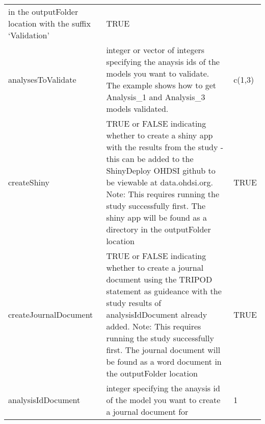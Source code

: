 \documentclass[
]{article}
\begin{document}
\begin{longtable}[]{@{}lll@{}}
\begin{minipage}[t]{0.46\columnwidth}
in the outputFolder location with the suffix `Validation'\strut
\end{minipage} & \begin{minipage}[t]{0.24\columnwidth}\raggedright
TRUE\strut
\end{minipage}\tabularnewline
\begin{minipage}[t]{0.21\columnwidth}\raggedright
analysesToValidate\strut
\end{minipage} & \begin{minipage}[t]{0.46\columnwidth}\raggedright
integer or vector of integers specifying the anaysis ids of the models
you want to validate. The example shows how to get Analysis\_1 and
Analysis\_3 models validated.\strut
\end{minipage} & \begin{minipage}[t]{0.24\columnwidth}\raggedright
c(1,3)\strut
\end{minipage}\tabularnewline
\begin{minipage}[t]{0.21\columnwidth}\raggedright
createShiny\strut
\end{minipage} & \begin{minipage}[t]{0.46\columnwidth}\raggedright
TRUE or FALSE indicating whether to create a shiny app with the results
from the study - this can be added to the ShinyDeploy OHDSI github to be
viewable at data.ohdsi.org. Note: This requires running the study
successfully first. The shiny app will be found as a directory in the
outputFolder location\strut
\end{minipage} & \begin{minipage}[t]{0.24\columnwidth}\raggedright
TRUE\strut
\end{minipage}\tabularnewline
\begin{minipage}[t]{0.21\columnwidth}\raggedright
createJournalDocument\strut
\end{minipage} & \begin{minipage}[t]{0.46\columnwidth}\raggedright
TRUE or FALSE indicating whether to create a journal document using the
TRIPOD statement as guideance with the study results of
analysisIdDocument already added. Note: This requires running the study
successfully first. The journal document will be found as a word
document in the outputFolder location\strut
\end{minipage} & \begin{minipage}[t]{0.24\columnwidth}\raggedright
TRUE\strut
\end{minipage}\tabularnewline
\begin{minipage}[t]{0.21\columnwidth}\raggedright
analysisIdDocument\strut
\end{minipage} & \begin{minipage}[t]{0.46\columnwidth}\raggedright
integer specifying the anaysis id of the model you want to create a
journal document for\strut
\end{minipage} & \begin{minipage}[t]{0.24\columnwidth}\raggedright
1\strut
\end{minipage}\tabularnewline
\bottomrule
\end{longtable}
\end{document}
